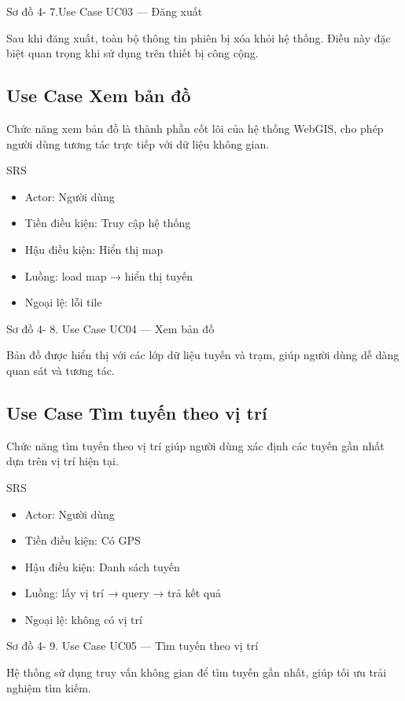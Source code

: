 \documentclass[13pt,a4paper]{report}
\begin{document}
Sơ đồ 4- 7.Use Case UC03 — Đăng xuất

Sau khi đăng xuất, toàn bộ thông tin phiên bị xóa khỏi hệ thống. Điều này đặc biệt quan trọng khi sử dụng trên thiết bị công cộng.

\subsection{Use Case Xem bản đồ}

Chức năng xem bản đồ là thành phần cốt lõi của hệ thống WebGIS, cho phép người dùng tương tác trực tiếp với dữ liệu không gian.

SRS

\begin{itemize}
    \item Actor: Người dùng
    \item Tiền điều kiện: Truy cập hệ thống
    \item Hậu điều kiện: Hiển thị map
    \item Luồng: load map → hiển thị tuyến
    \item Ngoại lệ: lỗi tile
\end{itemize}

Sơ đồ 4- 8. Use Case UC04 — Xem bản đồ

Bản đồ được hiển thị với các lớp dữ liệu tuyến và trạm, giúp người dùng dễ dàng quan sát và tương tác.

\subsection{Use Case Tìm tuyến theo vị trí}

Chức năng tìm tuyến theo vị trí giúp người dùng xác định các tuyến gần nhất dựa trên vị trí hiện tại.

SRS

\begin{itemize}
    \item Actor: Người dùng
    \item Tiền điều kiện: Có GPS
    \item Hậu điều kiện: Danh sách tuyến
    \item Luồng: lấy vị trí → query → trả kết quả
    \item Ngoại lệ: không có vị trí
\end{itemize}

Sơ đồ 4- 9. Use Case UC05 — Tìm tuyến theo vị trí

Hệ thống sử dụng truy vấn không gian để tìm tuyến gần nhất, giúp tối ưu trải nghiệm tìm kiếm.
\end{document}
